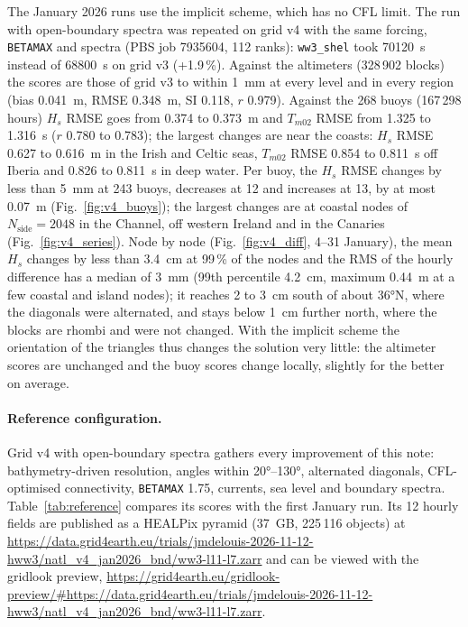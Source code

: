 \documentclass[11pt,a4paper]{article}
\newcommand{\nside}{N_{\mathrm{side}}}
\begin{document}
The January 2026 runs use the implicit scheme, which has no CFL limit.
The run with open-boundary spectra was repeated on grid v4 with the same
forcing, \texttt{BETAMAX} and spectra (PBS job 7935604, 112 ranks):
\texttt{ww3\_shel} took \SI{70120}{s} instead of \SI{68800}{s} on grid v3
(+1.9\,\%). Against the altimeters (328\,902 blocks) the scores are those
of grid v3 to within \SI{1}{mm} at every level and in every region (bias
\SI{+0.041}{m}, RMSE \SI{0.348}{m}, SI 0.118, $r$ 0.979). Against the 268
buoys (167\,298 hours) $H_s$ RMSE goes from 0.374 to \SI{0.373}{m} and
$T_{m02}$ RMSE from 1.325 to \SI{1.316}{s} ($r$ 0.780 to 0.783); the
largest changes are near the coasts: $H_s$ RMSE 0.627 to \SI{0.616}{m} in
the Irish and Celtic seas, $T_{m02}$ RMSE 0.854 to \SI{0.811}{s} off
Iberia and 0.826 to \SI{0.811}{s} in deep water. Per buoy, the $H_s$
RMSE changes by less than \SI{5}{mm} at 243 buoys, decreases at 12 and
increases at 13, by at most \SI{0.07}{m} (Fig.~\ref{fig:v4_buoys}); the
largest changes are at coastal nodes of $\nside=2048$ in the Channel, off
western Ireland and in the Canaries (Fig.~\ref{fig:v4_series}). Node by
node (Fig.~\ref{fig:v4_diff}, 4--31 January), the mean $H_s$ changes by
less than \SI{3.4}{cm} at 99\,\% of the nodes and the RMS of the hourly
difference has a median of \SI{3}{mm} (99th percentile \SI{4.2}{cm},
maximum \SI{0.44}{m} at a few coastal and island nodes); it reaches 2 to
\SI{3}{cm} south of about \ang{36}N, where the diagonals were alternated,
and stays below \SI{1}{cm} further north, where the blocks are rhombi and
were not changed. With the implicit scheme
the orientation of the triangles thus changes the solution very little:
the altimeter scores are unchanged and the buoy scores change locally,
slightly for the better on average.

\paragraph{Reference configuration.} Grid v4 with open-boundary spectra
gathers every improvement of this note: bathymetry-driven resolution,
angles within \ang{20}--\ang{130}, alternated diagonals, CFL-optimised
connectivity, \texttt{BETAMAX} 1.75, currents, sea level and boundary
spectra. Table~\ref{tab:reference} compares its scores with the first
January run. Its 12 hourly fields are published as a HEALPix pyramid
(\SI{37}{GB}, 225\,116 objects) at
\url{https://data.grid4earth.eu/trials/jmdelouis-2026-11-12-hww3/natl_v4_jan2026_bnd/ww3-l11-l7.zarr}
and can be viewed with the gridlook preview,
\url{https://grid4earth.eu/gridlook-preview/\#https://data.grid4earth.eu/trials/jmdelouis-2026-11-12-hww3/natl_v4_jan2026_bnd/ww3-l11-l7.zarr}.
\end{document}
